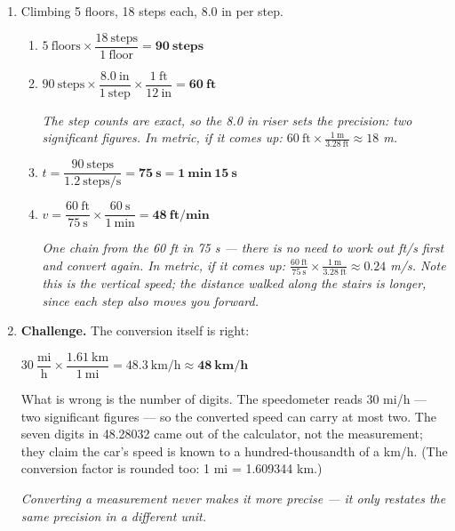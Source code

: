 \documentclass[12pt, twoside]{article}
\begin{document}
\begin{enumerate}[itemsep=0.2cm]
  $d = vt = (343~\text{m/s})(4.0~\text{s}) = 1372~\text{m} \approx \mathbf{1.4 \times 10^{3}~\textbf{m}}$
  \quad (2 s.f., because 4.0 s has two)

  $1372~\text{m} \times \dfrac{3.28~\text{ft}}{1~\text{m}} \times \dfrac{1~\text{mi}}{5280~\text{ft}}
  = 0.8523\ldots \approx \mathbf{0.85~\textbf{mi}}$

  \emph{This is the ``count the seconds'' rule of thumb: roughly 1 km every 3 seconds,
  or about 1 mile every 5 seconds.}

\item Climbing 5 floors, 18 steps each, 8.0 in per step.
  \begin{enumerate}[itemsep=0.2cm]
    \item $5~\text{floors} \times \dfrac{18~\text{steps}}{1~\text{floor}} = \mathbf{90~\textbf{steps}}$
    \item $90~\text{steps} \times \dfrac{8.0~\text{in}}{1~\text{step}}
      \times \dfrac{1~\text{ft}}{12~\text{in}} = \mathbf{60~\textbf{ft}}$

      \emph{The step counts are exact, so the 8.0 in riser sets the precision: two
      significant figures. In metric, if it comes up:
      $60~\text{ft} \times \frac{1~\text{m}}{3.28~\text{ft}} \approx 18$ m.}
    \item $t = \dfrac{90~\text{steps}}{1.2~\text{steps/s}} = \mathbf{75~\textbf{s}} = \mathbf{1~\textbf{min}~15~\textbf{s}}$
    \item $v = \dfrac{60~\text{ft}}{75~\text{s}} \times \dfrac{60~\text{s}}{1~\text{min}}
      = \mathbf{48~\textbf{ft/min}}$

      \emph{One chain from the 60 ft in 75 s --- there is no need to work out ft/s first
      and convert again. In metric, if it comes up:
      $\frac{60~\text{ft}}{75~\text{s}} \times \frac{1~\text{m}}{3.28~\text{ft}} \approx 0.24$ m/s.
      Note this is the \emph{vertical} speed; the distance walked along the stairs is longer,
      since each step also moves you forward.}
  \end{enumerate}

\item \textbf{Challenge.} The conversion itself is right:

  $30~\dfrac{\text{mi}}{\text{h}} \times \dfrac{1.61~\text{km}}{1~\text{mi}} = 48.3~\text{km/h}
  \approx \mathbf{48~\textbf{km/h}}$

  What is wrong is the number of digits. The speedometer reads 30 mi/h --- two significant
  figures --- so the converted speed can carry at most two. The seven digits in 48.28032
  came out of the calculator, not the measurement; they claim the car's speed is known to a
  hundred-thousandth of a km/h. (The conversion factor is rounded too: 1 mi = 1.609344 km.)

  \emph{Converting a measurement never makes it more precise --- it only restates the
  same precision in a different unit.}

\end{enumerate}
\end{document}
